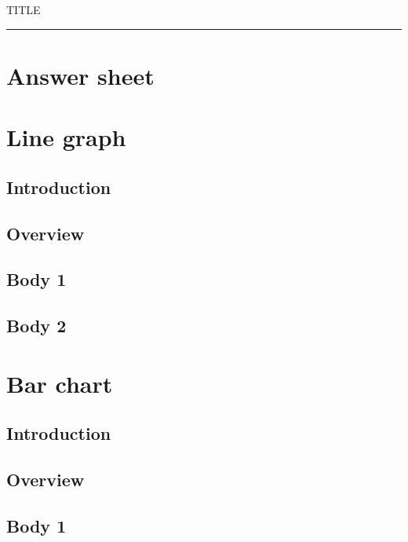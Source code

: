 \documentclass[11pt,a4paper]{article}
\begin{document}
{\small\sffamily\color{teal} {{TITLE}}}\par\hrule\medskip
\section*{Answer sheet}
\section*{Line graph}
\subsection*{Introduction}
\vspace{1cm}
\subsection*{Overview}
\vspace{1cm}
\subsection*{Body 1}
\vspace{1cm}
\subsection*{Body 2}
\vspace{1cm}
\clearpage
\section*{Bar chart}
\subsection*{Introduction}
\vspace{1cm}
\subsection*{Overview}
\vspace{1cm}
\subsection*{Body 1}
\vspace{1cm}
\end{document}
